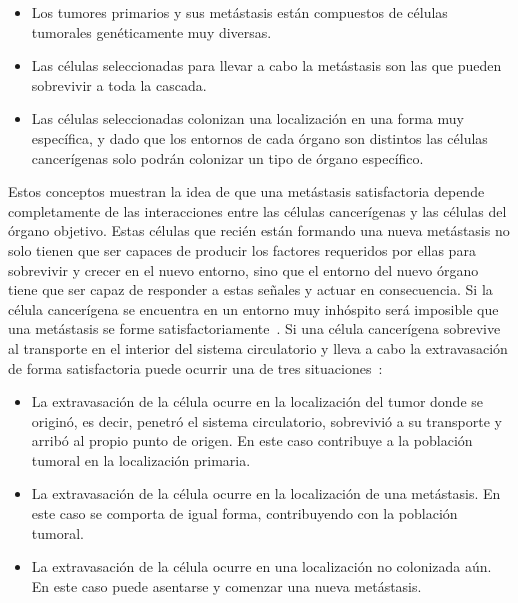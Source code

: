 \begin{itemize}
\item Los tumores primarios y sus met\'astasis est\'an compuestos de c\'elulas tumorales gen\'eticamente muy diversas.
\item Las c\'elulas seleccionadas para llevar a cabo la met\'astasis son las que pueden sobrevivir a toda la cascada.
\item Las c\'elulas seleccionadas colonizan una localizaci\'on en una forma muy espec\'ifica, y dado que los entornos de cada \'organo son distintos las c\'elulas cancer\'igenas solo podr\'an colonizar un tipo de \'organo espec\'ifico.
\end{itemize}

Estos conceptos muestran la idea de que una met\'astasis satisfactoria depende completamente de las interacciones entre las c\'elulas cancer\'igenas y las c\'elulas del \'organo objetivo. Estas c\'elulas que reci\'en est\'an formando una nueva met\'astasis no solo tienen que ser capaces de producir los factores requeridos por ellas para sobrevivir y crecer en el nuevo entorno, sino que el entorno del nuevo \'organo tiene que ser capaz de responder a estas se\~nales y actuar en consecuencia. Si la c\'elula cancer\'igena se encuentra en un entorno muy inh\'ospito ser\'a imposible que una met\'astasis se forme satisfactoriamente~\cite{metastasis}. Si una c\'elula cancer\'igena sobrevive al transporte en el interior del sistema circulatorio y lleva a cabo la extravasaci\'on de forma satisfactoria puede ocurrir una de tres situaciones~\cite{circulating}:

\begin{itemize}
\item La extravasaci\'on de la c\'elula ocurre en la localizaci\'on del tumor donde se origin\'o, es decir, penetr\'o el sistema circulatorio, sobrevivi\'o a su transporte y arrib\'o al propio punto de origen. En este caso contribuye a la poblaci\'on tumoral en la localizaci\'on primaria.
\item La extravasaci\'on de la c\'elula ocurre en la localizaci\'on de una met\'astasis. En este caso se comporta de igual forma, contribuyendo con la poblaci\'on tumoral.
\item La extravasaci\'on de la c\'elula ocurre en una localizaci\'on no colonizada a\'un. En este caso puede asentarse y comenzar una nueva met\'astasis.
\end{itemize}

